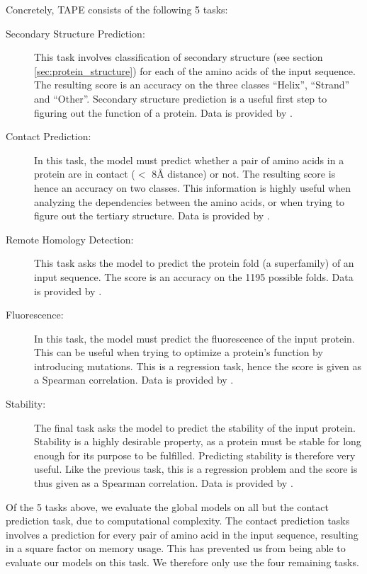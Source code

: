 Concretely, TAPE consists of the following 5 tasks:
\begin{description}
    \item[Secondary Structure Prediction:] This task involves classification of secondary structure (see section \ref{sec:protein_structure}) for each of the amino acids of the input sequence. The resulting score is an accuracy on the three classes ``Helix'', ``Strand'' and ``Other''. Secondary structure prediction is a useful first step to figuring out the function of a protein. Data is provided by \textcite{pdb, casp, netsurfp}.
    \item[Contact Prediction:] In this task, the model must predict whether a pair of amino acids in a protein are in contact ($<$ 8Å distance) or not. The resulting score is hence an accuracy on two classes. This information is highly useful when analyzing the dependencies between the amino acids, or when trying to figure out the tertiary structure. Data is provided by \textcite{scop, casp, proteinnet, pdb}.
    \item[Remote Homology Detection:] This task asks the model to predict the protein fold (a superfamily) of an input sequence. The score is an accuracy on the 1195 possible folds. Data is provided by \textcite{scop}.
    \item[Fluorescence:] In this task, the model must predict the fluorescence of the input protein. This can be useful when trying to optimize a protein's function by introducing mutations. This is a regression task, hence the score is given as a Spearman correlation. Data is provided by \cite{sarkisyan2016}.
    \item[Stability:] The final task asks the model to predict the stability of the input protein. Stability is a highly desirable property, as a protein must be stable for long enough for its purpose to be fulfilled. Predicting stability is therefore very useful. Like the previous task, this is a regression problem and the score is thus given as a Spearman correlation. Data is provided by \cite{rocklin2017}.
\end{description}

Of the 5 tasks above, we evaluate the global models on all but the contact prediction task, due to computational complexity. The contact prediction tasks involves a prediction for every pair of amino acid in the input sequence, resulting in a square factor on memory usage. This has prevented us from being able to evaluate our models on this task. We therefore only use the four remaining tasks.

